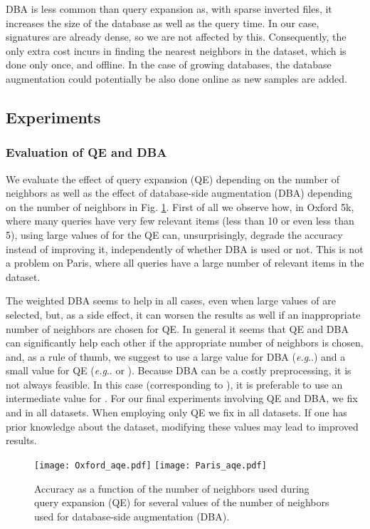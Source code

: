 \documentclass[twocolumn]{svjour3}          \smartqed  \usepackage{graphicx}
\makeatletter
\DeclareRobustCommand\onedot{\futurelet\@let@token\@onedot}
\def\@onedot{\ifx\@let@token.\else.\null\fi\xspace}
\def\eg{\emph{e.g}\onedot} \def\Eg{\emph{E.g}\onedot}
\makeatother
\begin{document}
DBA is less common than query expansion as, with sparse inverted files, it increases the size of the database as well as the query time. In our case, signatures are already dense, so we are not affected by this. Consequently, the only extra cost incurs in finding the nearest neighbors in the dataset, which is done only once, and offline.
In the case of growing databases, the database augmentation could potentially be also done online as new samples are added.

\subsection{Experiments}
\label{sub:part3xps}

\subsubsection{Evaluation of QE and DBA}
We evaluate the effect of query expansion (QE) depending on the number of neighbors  as well as the effect of database-side augmentation (DBA) depending on the number of neighbors  in Fig. \ref{fig:aqe}.
First of all we observe how, in Oxford 5k, where many queries have very few relevant items (less than 10 or even less than 5), using large values of  for the QE can, unsurprisingly, degrade the accuracy instead of improving it, independently of whether DBA is used or not. This is not a problem on Paris, where all queries have a large number of relevant items in the dataset. 

The weighted DBA seems to help in all cases, even when large values of  are selected, but, as a side effect, it can worsen the results as well if an inappropriate number of neighbors are chosen for QE.
In general it seems that QE and DBA can significantly help each other if the appropriate number of neighbors is chosen, and, as a rule of thumb, we suggest to use a large value for DBA (\eg ) and a small value for QE (\eg  or ). 
Because DBA can be a costly preprocessing, it is not always feasible. In this case (corresponding to ), it is preferable to use an intermediate value for .
For our final experiments involving QE and DBA, we fix  and  in all datasets. When employing only QE we fix  in all datasets. If one has prior knowledge about the dataset, modifying these values may lead to improved results.


\begin{figure}[t!]
 \begin{centering}
\texttt{[image: Oxford\_aqe.pdf]}
\texttt{[image: Paris\_aqe.pdf]}
 \par\end{centering}
 \caption{\label{fig:aqe} Accuracy as a function of the number of neighbors  used during query expansion (QE) for several values of the number of neighbors  used for database-side augmentation (DBA).}
 \end{figure}
\end{document}

